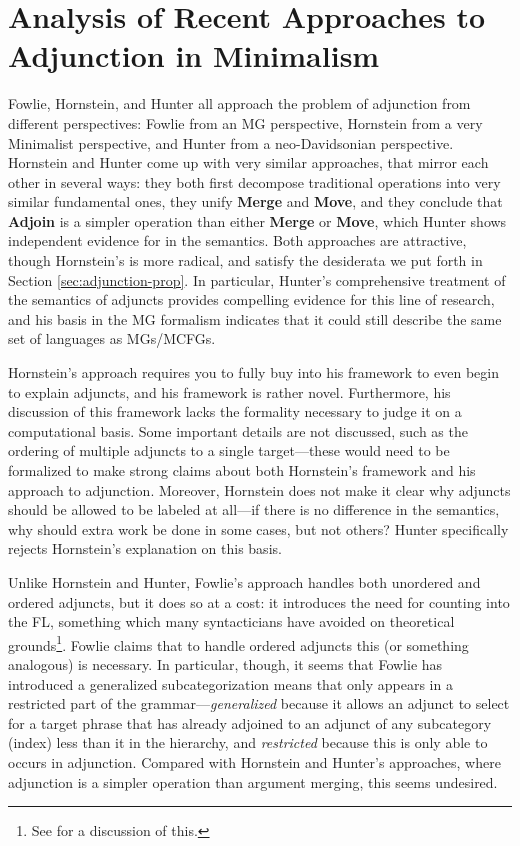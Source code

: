 \documentclass{article}
\begin{document}
\section{Analysis of Recent Approaches to Adjunction in Minimalism}
\label{sec:analysis}

Fowlie, Hornstein, and Hunter all approach the problem of adjunction
from different perspectives: Fowlie from an MG perspective, Hornstein
from a very Minimalist perspective, and Hunter from a neo-Davidsonian
perspective.  Hornstein and Hunter come up with very similar
approaches, that mirror each other in several ways: they both first
decompose traditional operations into very similar fundamental ones,
they unify \textbf{Merge} and \textbf{Move}, and they conclude that
\textbf{Adjoin} is a simpler operation than either \textbf{Merge} or
\textbf{Move}, which Hunter shows independent evidence for in the
semantics.  Both approaches are attractive, though Hornstein's is more
radical, and satisfy the desiderata we put forth in Section
\ref{sec:adjunction-prop}.  In particular, Hunter's comprehensive
treatment of the semantics of adjuncts provides compelling evidence
for this line of research, and his basis in the MG formalism indicates
that it could still describe the same set of languages as MGs/MCFGs.

Hornstein's approach requires you to fully buy into his framework to
even begin to explain adjuncts, and his framework is rather novel.
Furthermore, his discussion of this framework lacks the formality
necessary to judge it on a computational basis.  Some important
details are not discussed, such as the ordering of multiple adjuncts
to a single target---these would need to be formalized to make strong
claims about both Hornstein's framework and his approach to
adjunction.  Moreover, Hornstein does not make it clear why adjuncts
should be allowed to be labeled at all---if there is no difference in
the semantics, why should extra work be done in some cases, but not
others?  Hunter specifically rejects Hornstein's explanation on this
basis.

Unlike Hornstein and Hunter, Fowlie's approach handles both unordered
and ordered adjuncts, but it does so at a cost: it introduces the need
for counting into the FL, something which many syntacticians have
avoided on theoretical grounds\footnote{See \cite{hornstein2008b} for
  a discussion of this.}.  Fowlie claims that to handle ordered
adjuncts this (or something analogous) is necessary.  In particular,
though, it seems that Fowlie has introduced a generalized
subcategorization means that only appears in a restricted part of the
grammar---\textit{generalized} because it allows an adjunct to select
for a target phrase that has already adjoined to an adjunct of any
subcategory (index) less than it in the hierarchy, and
\textit{restricted} because this is only able to occurs in adjunction.
Compared with Hornstein and Hunter's approaches, where adjunction is a
simpler operation than argument merging, this seems undesired.
\end{document}
